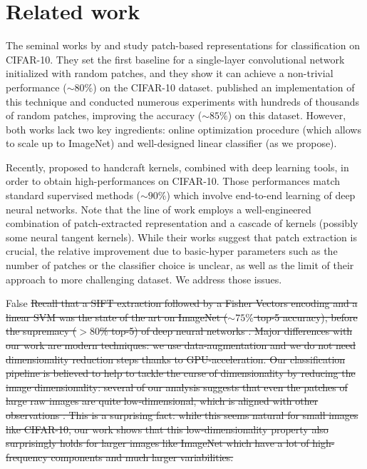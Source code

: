 \documentclass{article} %
\begin{document}
\section{Related work}\label{related_work}

The seminal works by \cite{coates2011analysis} and \cite{coates2011importance}  study patch-based representations for classification on CIFAR-10.
They set the first baseline for a single-layer convolutional network initialized with random patches, and they show it can achieve a non-trivial performance ($\sim 80 \%$) on the CIFAR-10 dataset. 
 \cite{recht2019imagenet} published an implementation of this technique and conducted numerous experiments with hundreds of thousands of random patches, improving the accuracy ($\sim 85 \%$) on this dataset.
However, both works lack two key ingredients: online optimization procedure  (which allows to scale up to ImageNet) and well-designed linear classifier (as we propose).

Recently, \citep{li2019enhanced,shankar2020neural} proposed to handcraft kernels, combined with deep learning tools, in order to obtain high-performances on CIFAR-10.
Those performances  match standard supervised methods ($\sim 90\%$) which involve end-to-end learning of deep neural networks.
Note that the line of work \citep{li2019enhanced,shankar2020neural,mairal2016end} employs a well-engineered combination of patch-extracted representation and a cascade of kernels (possibly some neural tangent kernels).
While their works suggest that patch extraction is crucial, the relative improvement due to basic-hyper parameters such as the number of patches or the classifier choice is unclear, as well as the limit of their approach to more challenging dataset.
We address those issues.



\if False
\sout{Recall that a SIFT extraction \cite{lowe2004distinctive} followed by a Fisher Vectors encoding \citep{sanchez2013image} and a linear SVM was the state of the art on ImageNet ($\sim 75\% $ top-5 accuracy), before the supremacy ($ > 80$\% top-5) of deep neural networks \citet{krizhevsky2012imagenet}.
Major differences with our work are modern techniques: we use data-augmentation and we do not need dimensionality reduction steps thanks to GPU-acceleration.
Our classification pipeline is believed to help to tackle the curse of dimensionality by reducing the image dimensionality: several of our analysis  suggests that even the patches of large raw images are quite low-dimensional, which is aligned with other observations \citep{Oyallon_2017_CVPR}.
This is a surprising fact: while this seems natural for small  images like CIFAR-10, our work shows that this low-dimensionality property also surprisingly holds for larger images like ImageNet which have a lot of high-frequency components and much larger variabilities.}
\fi
\end{document}

